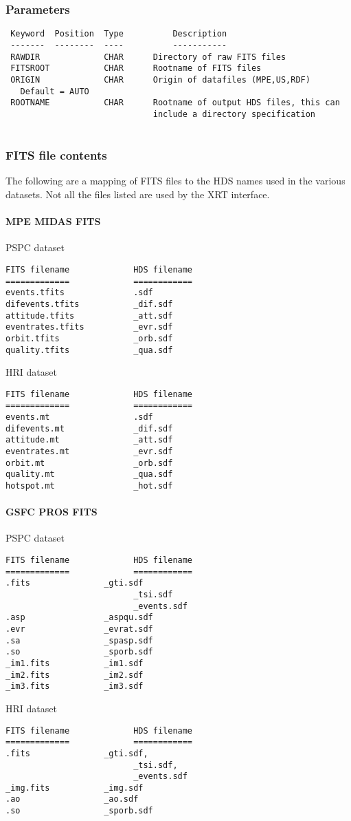 \documentclass{book}
\renewcommand{\_}{{\tt\char'137}}     %
\begin{document}
\subsubsection{Parameters}
\begin{verbatim}
 Keyword  Position  Type          Description
 -------  --------  ----          -----------
 RAWDIR             CHAR      Directory of raw FITS files
 FITSROOT           CHAR      Rootname of FITS files
 ORIGIN             CHAR      Origin of datafiles (MPE,US,RDF)
   Default = AUTO
 ROOTNAME           CHAR      Rootname of output HDS files, this can
                              include a directory specification
 
\end{verbatim}\subsubsection{FITS file contents}
The following are a mapping of FITS files to the HDS names used in
the various datasets. Not all the files listed are used by the XRT
interface.
 
\paragraph{MPE MIDAS FITS}
PSPC dataset
\begin{verbatim}
FITS filename             HDS filename
=============             ============
events.tfits              .sdf
difevents.tfits           _dif.sdf
attitude.tfits            _att.sdf
eventrates.tfits          _evr.sdf
orbit.tfits               _orb.sdf
quality.tfits             _qua.sdf
\end{verbatim}
HRI dataset
\begin{verbatim}
FITS filename             HDS filename
=============             ============
events.mt                 .sdf
difevents.mt              _dif.sdf
attitude.mt               _att.sdf
eventrates.mt             _evr.sdf
orbit.mt                  _orb.sdf
quality.mt                _qua.sdf
hotspot.mt                _hot.sdf
\end{verbatim}
\paragraph{GSFC PROS FITS}
PSPC dataset
\begin{verbatim}
FITS filename             HDS filename
=============             ============
.fits               _gti.sdf
                          _tsi.sdf
                          _events.sdf
.asp                _aspqu.sdf
.evr                _evrat.sdf
.sa                 _spasp.sdf
.so                 _sporb.sdf
_im1.fits           _im1.sdf
_im2.fits           _im2.sdf
_im3.fits           _im3.sdf
\end{verbatim}
HRI dataset
\begin{verbatim}
FITS filename             HDS filename
=============             ============
.fits               _gti.sdf,
                          _tsi.sdf,
                          _events.sdf
_img.fits           _img.sdf
.ao                 _ao.sdf
.so                 _sporb.sdf
\end{verbatim}
\end{document}
